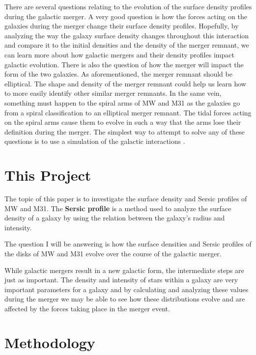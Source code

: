 \documentclass[linenumbers,trackchanges,twocolumn]{aastex7}
\begin{document}
There are several questions relating to the evolution of the surface
density profiles during the galactic merger. A very good question is
how the forces acting on the galaxies during the merger change
their surface density profiles. Hopefully, by analyzing the way the
galaxy surface density changes throughout this interaction and compare
it to the initial densities and the density of the merger remnant, we
can learn more about how galactic mergers and their density profiles
impact galactic evolution. There is also the question of how the
merger will impact the form of the two galaxies. As
aforementioned, the merger remnant should be elliptical. The shape and
density of the merger remnant could help us learn how to more easily
identify other similar merger remnants. In the same vein, something
must happen to the spiral arms of MW and M31 as the galaxies go from a
spiral classification to an elliptical merger remnant. The tidal
forces acting on the spiral arms cause them to evolve in such a way
that the arms lose their definition during the merger. The simplest
way to attempt to solve any of these questions is to use a simulation
of the galactic interactions
\citep{van_der_Marel_Besla_Cox_Sohn_Anderson_2012}.

\section{This Project} \label{sec:style}

The topic of this paper is to investigate the surface density and
Sersic profiles of MW and M31. The \textbf{Sersic profile} is a
method used to analyze the surface density of a galaxy by using the
relation between the galaxy's radius and intensity.

The question I will be answering is how the surface densities and
Sersic profiles of the disks of MW and M31 evolve over the
course of the galactic merger.

While galactic mergers result in a new galactic form, the intermediate
steps are just as important. The density and intensity of stars within
a galaxy are very important parameters for a galaxy and by calculating
and analyzing these values during the merger we may be able to see how
these distributions evolve and are affected by the forces taking place
in the merger event.

\section{Methodology} \label{sec:style}
\end{document}
